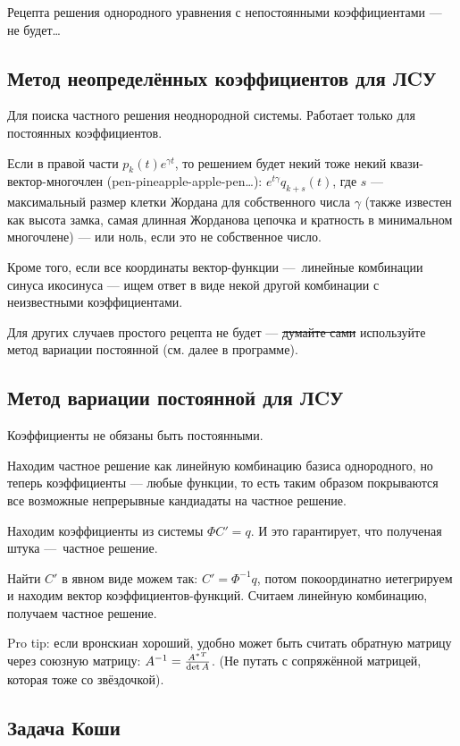 \documentclass[12pt, a4paper]{article}
\begin{document}
Рецепта решения однородного уравнения с непостоянными коэффициентами — не будет…

\subsection{Метод неопределённых коэффициентов для ЛCУ}

Для поиска частного решения неоднородной системы.
Работает только для постоянных коэффициентов.

Если в правой части $p_k(t) e^{\gamma t}$, 
то решением будет некий тоже некий квази-вектор-многочлен (pen-pineapple-apple-pen…): 
$e^{t\gamma}q_{k + s}(t)$, где $s$ — максимальный 
размер клетки Жордана для собственного числа $\gamma$ 
(также известен как высота замка, 
самая длинная Жорданова цепочка и кратность в минимальном многочлене)
— или ноль, если это не собственное число.

Кроме того, если все координаты вектор-функции — линейные комбинации синуса икосинуса — 
ищем ответ в виде некой другой комбинации с неизвестными коэффициентами.

Для других случаев простого рецепта не будет — \sout{думайте сами} используйте метод вариации постоянной (см. далее в программе).

\subsection{Метод вариации постоянной для ЛCУ}

Коэффициенты не обязаны быть постоянными.

Находим частное решение как линейную комбинацию базиса однородного, но теперь коэффициенты — любые функции, 
то есть таким образом покрываются все возможные непрерывные кандиадаты на частное решение.

Находим коэффициенты из системы $\Phi C' = q$. И это гарантирует, что полученая штука — частное решение.

Найти $C'$ в явном виде можем так: $C' = \Phi^{-1} q$, потом покоординатно иетегрируем и находим вектор коэффициентов-функций.
Считаем линейную комбинацию, получаем частное решение.

Pro tip: если вронскиан хороший, удобно может быть считать обратную матрицу через союзную матрицу: $A^{-1} = \frac{{A^{*}}^T}{\operatorname{det} A}$.
(Не путать с сопряжённой матрицей, которая тоже со звёздочкой).

\subsection{Задача Коши}
\end{document}

